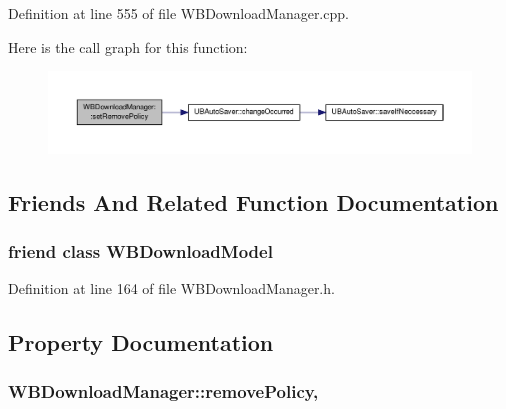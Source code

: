 Definition at line 555 of file W\-B\-Download\-Manager.\-cpp.



Here is the call graph for this function\-:
\nopagebreak
\begin{figure}[H]
\begin{center}
\leavevmode
\includegraphics[width=350pt]{d3/dda/class_w_b_download_manager_a5a5f33b920108d0a0d9e7fce091dd979_cgraph}
\end{center}
\end{figure}




\subsection{Friends And Related Function Documentation}
\hypertarget{class_w_b_download_manager_a40bac202323241472ac8ac200dd00a98}{
\subsubsection[{W\-B\-Download\-Model}]{\setlength{\rightskip}{0pt plus 5cm}friend class {\bf W\-B\-Download\-Model}\hspace{0.3cm}{\ttfamily [friend]}}}\label{d3/dda/class_w_b_download_manager_a40bac202323241472ac8ac200dd00a98}


Definition at line 164 of file W\-B\-Download\-Manager.\-h.



\subsection{Property Documentation}
\hypertarget{class_w_b_download_manager_ae5c266e269523e64042724bdf2264898}{
\subsubsection[{remove\-Policy}]{ W\-B\-Download\-Manager\-::remove\-Policy\hspace{0.3cm}{\ttfamily [read]}, {\ttfamily [write]}}}\label{d3/dda/class_w_b_download_manager_ae5c266e269523e64042724bdf2264898}



